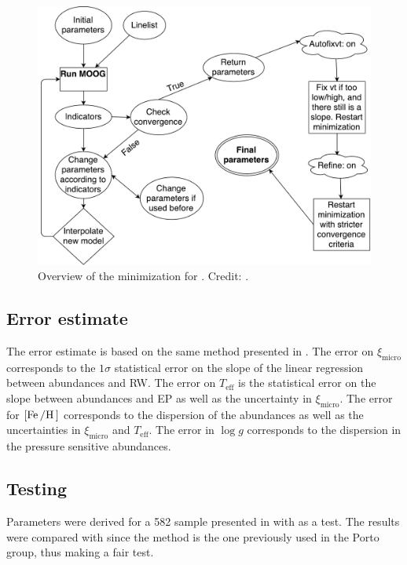 \begin{figure}[htpb!]
    \centering
    \includegraphics[width=0.85\linewidth]{figures/FASMA_minimization.pdf}
    \caption{Overview of the minimization for . Credit: \citet{Andreasen2017a}.}
    \label{fig:minimization}
\end{figure}


\subsection{Error estimate}
\label{sec:error_estimate}

The error estimate is based on the same method presented in \citet{Neuforge1997}. The error on
$\xi_\mathrm{micro}$ corresponds to the $1\sigma$ statistical error on the slope of the linear
regression between  abundances and RW. The error on $T_\mathrm{eff}$ is the statistical
error on the slope between  abundances and EP as well as the uncertainty in
$\xi_\mathrm{micro}$. The error for $[\ion{Fe}/\ion{H}]$ corresponds to the dispersion of the
 abundances as well as the uncertainties in $\xi_\mathrm{micro}$ and $T_\mathrm{eff}$.
The error in $\log g$ corresponds to the dispersion in the pressure sensitive 
abundances.

\subsection{Testing }
\label{sec:fasma_test}

Parameters were derived for a 582 sample presented in \citet{Sousa2011} with  as a test.
The results were compared with \citet{Sousa2011} since the method is the one previously used in the
Porto group, thus making a fair test.


